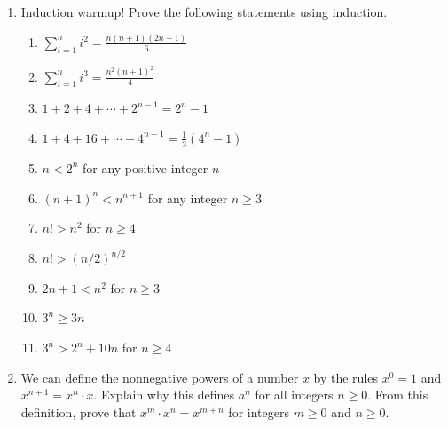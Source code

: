 \begin{exercises}
    \begin{enumerate}
        \item Induction warmup! Prove the following statements using induction.
            \begin{enumerate}
                \item $\displaystyle\sum_{i=1}^n i^2 = \frac{n\left(n+1\right)\left(2n+1\right)}{6}$
                \item $\displaystyle\sum_{i=1}^n i^3 = \frac{n^2 \left(n+1\right)^2}{4}$
                \item $1 + 2 + 4 + \cdots + 2^{n-1} = 2^n - 1$
                \item $1 + 4 + 16 + \cdots + 4^{n-1} = \frac{1}{3} \left(4^n - 1\right)$
                \item $n < 2^n$ for any positive integer $n$
                \item $\left(n+1\right)^n < n^{n+1}$ for any integer $n \ge 3$
                \item $n! > n^2$ for $n \ge 4$
                \item $n! > \left(n/2\right)^{n/2}$
                \item $2n+1 < n^2$ for $n \ge 3$
                \item $3^n \ge 3n$
                \item $3^n > 2^n + 10n$ for $n \ge 4$
            \end{enumerate}
        
        \item [\challenge] We can define the nonnegative powers of a number $x$ by the rules $x^0 = 1$ and $x^{n+1} = x^n \cdot x$. Explain why this defines $a^n$ for all integers $n \ge 0$. From this definition, prove that $x^m \cdot x^n = x^{m+n}$ for integers $m \ge 0$ and $n \ge 0$.


\end{enumerate}
\end{exercises}
